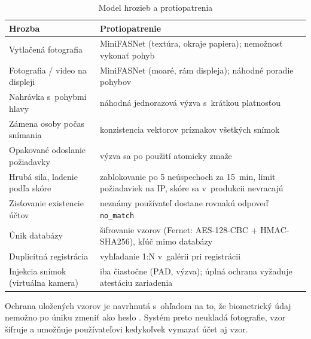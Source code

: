 \begin{table}[H]
  \centering
  \caption{Model hrozieb a protiopatrenia}
  \label{tab:hrozby}
  \small
  \begin{tabularx}{\textwidth}{@{}>{\raggedright\arraybackslash}p{4.2cm} X@{}}
    \toprule
    Hrozba & Protiopatrenie \\
    \midrule
    Vytlačená fotografia & MiniFASNet (textúra, okraje papiera); nemožnosť vykonať pohyb \\
    Fotografia / video na displeji & MiniFASNet (moaré, rám displeja); náhodné poradie pohybov \\
    Nahrávka s~pohybmi hlavy & náhodná jednorazová výzva s~krátkou platnosťou \\
    Zámena osoby počas snímania & konzistencia vektorov príznakov všetkých snímok \\
    Opakované odoslanie požiadavky & výzva sa po použití atomicky zmaže \\
    Hrubá sila, ladenie podľa skóre & zablokovanie po 5 neúspechoch za 15~min, limit požiadaviek na IP, skóre sa v~produkcii nevracajú \\
    Zisťovanie existencie účtov & neznámy používateľ dostane rovnakú odpoveď \texttt{no\_match} \\
    Únik databázy & šifrovanie vzorov (Fernet: AES-128-CBC + HMAC-SHA256), kľúč mimo databázy \\
    Duplicitná registrácia & vyhľadanie 1:N v~galérii pri registrácii \\
    Injekcia snímok (virtuálna kamera) & iba čiastočne (PAD, výzva); úplná ochrana vyžaduje atestáciu zariadenia \\
    \bottomrule
  \end{tabularx}
\end{table}

Ochrana uložených vzorov je navrhnutá s~ohľadom na to, že biometrický údaj nemožno
po úniku zmeniť ako heslo \cite{abdullahi2024template}. Systém preto neukladá
fotografie, vzor šifruje a umožňuje používateľovi kedykoľvek vymazať účet aj vzor.
